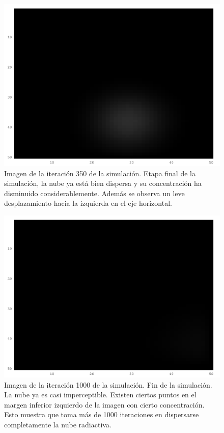 \documentclass[twocolumn,a4paper,10pt]{article}
\begin{document}
\begin{figure}[H]
        \includegraphics[width=\linewidth]{./images/iteration-350.png}
        \caption{Imagen de la iteraci\'on 350 de la simulaci\'on. Etapa final de la simulaci\'on, la nube ya est\'a bien dispersa y su concentraci\'on ha 
        disminuido considerablemente. Adem\'as se observa un leve desplazamiento hacia la izquierda en el eje horizontal.}
        \label{fig:350-iteraciones}
\end{figure}

\begin{figure}[H]
        \includegraphics[width=\linewidth]{./images/iteration-1000.png}
        \caption{Imagen de la iteraci\'on 1000 de la simulaci\'on. Fin de la simulaci\'on. La nube ya es casi imperceptible. Existen ciertos puntos en el margen 
        inferior izquierdo de la imagen con cierto concentraci\'on. Esto muestra que toma m\'as de 1000 iteraciones en dispersarse completamente la nube radiactiva.}
        \label{fig:1000-iteraciones}
\end{figure}
\end{document}
